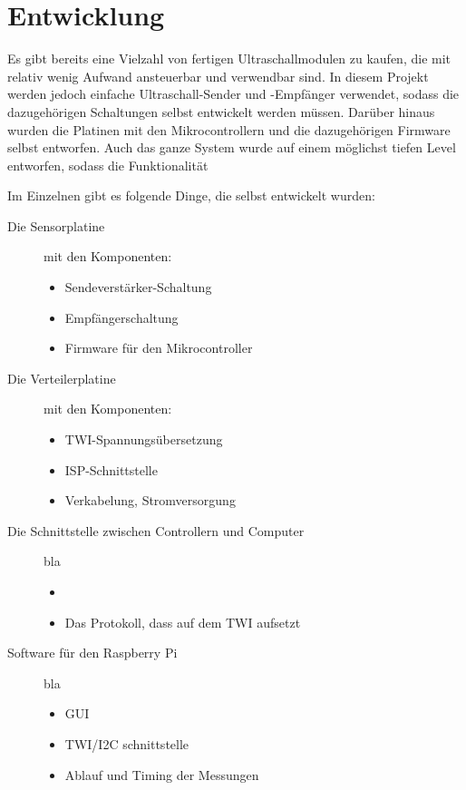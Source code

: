\section{Entwicklung} %
Es gibt bereits eine Vielzahl von fertigen Ultraschallmodulen zu kaufen, die mit relativ wenig Aufwand ansteuerbar und verwendbar sind. In diesem Projekt werden jedoch einfache Ultraschall-Sender und -Empfänger verwendet, sodass die dazugehörigen Schaltungen selbst entwickelt werden müssen. Darüber hinaus wurden die Platinen mit den Mikrocontrollern und die dazugehörigen Firmware selbst entworfen. Auch das ganze System wurde auf einem möglichst tiefen Level entworfen, sodass die Funktionalität 

Im Einzelnen gibt es folgende Dinge, die selbst entwickelt wurden:
\begin{description}
	\item[Die Sensorplatine] mit den Komponenten:
	\begin{itemize}
		\item Sendeverstärker-Schaltung
		\item Empfängerschaltung
		\item Firmware für den Mikrocontroller
	\end{itemize}
	\item[Die Verteilerplatine] mit den Komponenten:
	\begin{itemize}
		\item TWI-Spannungsübersetzung
		\item ISP-Schnittstelle
		\item Verkabelung, Stromversorgung
	\end{itemize}
	\item[Die Schnittstelle zwischen Controllern und Computer] bla
	\begin{itemize}
		\item 
		\item Das Protokoll, dass auf dem \ac{TWI} aufsetzt
	\end{itemize}
	\item[Software für den Raspberry Pi] bla
	\begin{itemize}
		\item GUI
		\item TWI/I2C schnittstelle
		\item Ablauf und Timing der Messungen
	\end{itemize}
\end{description}



